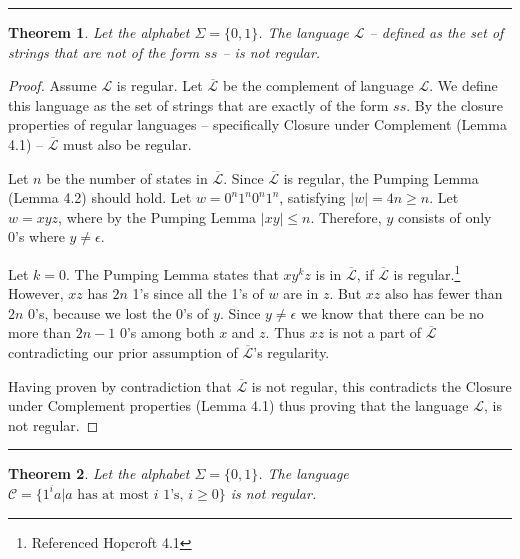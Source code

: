 \documentclass[11pt]{report}
\newcounter{problem}
\theoremstyle{definition}
\theoremstyle{plain}
\theoremstyle{plain}
\newtheorem{theorem}{Theorem}[problem]
\begin{document}
\hrule

\begin{theorem}
Let the alphabet $\Sigma = \{0,1\}$. 
The language $\mathcal{L}$ -- defined as the set of strings that are not of the form $ss$ -- is not regular.
\end{theorem}

\begin{proof}
Assume $\mathcal{L}$ is regular. Let $\overline{\mathcal{L}}$ be the complement of language $\mathcal{L}$.
We define this language as the set of strings that are exactly of the form $ss$.
By the closure properties of regular languages -- specifically Closure under Complement (Lemma 4.1) --
$\overline{\mathcal{L}}$ must also be regular.\newline

\noindent Let $n$ be the number of states in $\overline{\mathcal{L}}$. 
Since $\overline{\mathcal{L}}$ is regular, the Pumping Lemma (Lemma 4.2) should hold.
Let $w=0^{n}1^{n}0^{n}1^{n}$, satisfying $|w|=4n \geq n$. 
Let $w=xyz$, where by the Pumping Lemma $|xy| \leq n$. 
Therefore, $y$ consists of only 0's where $y \neq \epsilon$.\newline

\noindent Let $k=0$. 
The Pumping Lemma states that $xy^{k}z$ is in $\overline{\mathcal{L}}$,
if $\overline{\mathcal{L}}$ is regular.\footnote{Referenced Hopcroft 4.1 }
However, $xz$ has $2n$ 1's since all the 1's of $w$ are in $z$.
But $xz$ also has fewer than $2n$ 0's, because we lost the 0's of $y$.
Since $y \neq \epsilon$ we know that there can be no more than $2n-1$ 0's among both $x$ and $z$.
Thus $xz$ is not a part of $\overline{\mathcal{L}}$ 
contradicting our prior assumption of $\overline{\mathcal{L}}$'s regularity.\newline

\noindent Having proven by contradiction that $\overline{\mathcal{L}}$ is not regular, 
this contradicts the Closure under Complement properties (Lemma 4.1) 
thus proving that the language $\mathcal{L}$, is not regular.
\end{proof}

\hrule

\begin{theorem}
Let the alphabet $\Sigma = \{0,1\}$. 
The language $\mathcal{C}=\{ 1^{i}a|a \text{ has at most } i \text{ 1's, } i \geq 0\}$ is not regular.
\end{theorem}
\end{document}
